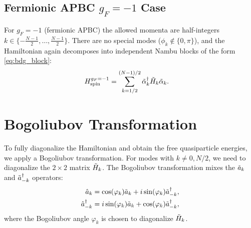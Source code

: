 \documentclass[aps,prx,twocolumn,superscriptaddress,nofootinbib,nolongbibliography,nobalancelastpage,10pt,floatfix]{revtex4-2}
\begin{document}
\subsection{Fermionic APBC $g_F = -1$ Case}

For $g_F=-1$ (fermionic APBC) the allowed momenta are half-integers
$k\in\{-\frac{N-1}{2},\dots,\frac{N-1}{2}\}$.
There are no special modes ($\phi_k\not\in\{0,\pi\}$), and the Hamiltonian again decomposes into independent Nambu blocks of the form \cref{eq:bdg_block}:
\begin{align}
    H_{\mathrm{spin}}^{g_F=-1} &= \sum_{k=1/2}^{(N-1)/2} \tilde{\alpha}_k^\dag \tilde{H}_k \tilde{\alpha}_k.
\end{align}


\section{Bogoliubov Transformation}
\label{sec:bogoliubov}
To fully diagonalize the Hamiltonian and obtain the free quasiparticle energies, we apply a Bogoliubov transformation. For modes with $k \neq 0, N/2$, we need to diagonalize the $2 \times 2$ matrix $\tilde{H}_k$. The Bogoliubov transformation mixes the $\tilde{a}_k$ and $\tilde{a}_{-k}^\dag$ operators:
\begin{align}
    \hat{a}_k         &= \cos(\varphi_k) \tilde{a}_k + i\sin(\varphi_k) \tilde{a}_{-k}^\dag,\\
    \hat{a}_{-k}^\dag &= i\sin(\varphi_k) \tilde{a}_k + \cos(\varphi_k) \tilde{a}_{-k}^\dag,
\end{align}
where the Bogoliubov angle $\varphi_k$ is chosen to diagonalize $\tilde{H}_k$.
\end{document}
